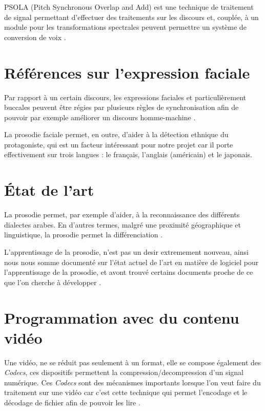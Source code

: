 PSOLA (Pitch Synchronous Overlap and Add) est une technique de traitement de signal permettant d'effectuer des traitements sur les discours et, couplée, à un module pour les transformations spectrales peuvent permettre un système de conversion de voix \cite{valbret1992voice}.

\section{Références sur l'expression faciale}\label{ref_transfo_faciales}

Par rapport à un certain discours, les expressions faciales et particulièrement buccales peuvent être régies par plusieurs règles de synchronisation afin de pouvoir par exemple améliorer un discours homme-machine \cite{beskow1995rule} .

La prosodie faciale permet, en outre, d'aider à la détection ethnique du protagoniste, qui est un facteur intéressant pour notre projet car il porte effectivement sur trois langues : le français, l'anglais (américain) et le japonais\cite{matsumoto1992american}.


\section{État de l'art}\label{state_of_the_art}

La prosodie permet, par exemple d'aider, à la reconnaissance des différents dialectes arabes. En d'autres termes, malgré une proximité géographique et linguistique, la prosodie permet la différenciation \cite{rouas2006identification}.

L'apprentissage de la prosodie, n'est pas un desir extremement nouveau, ainsi nous nous somme documenté sur l'état actuel de l'art en matière de logiciel pour l'apprentissage de la prosodie, et avont trouvé certains documents proche de ce que l'on cherche à développer \cite{10.4000/alsic.332}. 

\section{Programmation avec du contenu vidéo}

Une vidéo, ne se réduit pas seulement à un format, elle se compose également des \textit{Codecs}, ces dispositifs permettent la compression/decompression d'un signal numérique. Ces \textit{Codecs} sont des mécanismes importants lorsque l'on veut faire du traitement sur une vidéo car c'est cette technique qui permet l'encodage et le décodage de fichier afin de pouvoir les lire \cite{ghanbari1999video} \cite{he2013introduction}.
